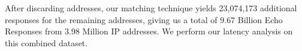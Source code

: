 After discarding addresses, our matching technique yields 23,074,173
additional responses for the remaining addresses, giving us a total of
9.67 Billion Echo Responses from 3.98 Million IP addresses. We perform
our latency analysis on this combined dataset.



